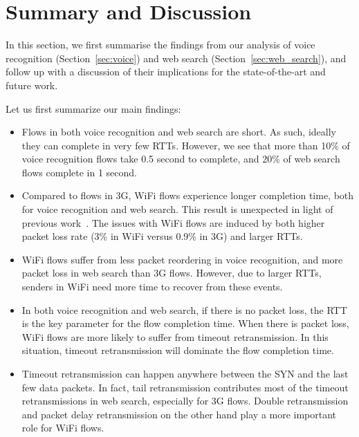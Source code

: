 
\section{Summary and Discussion}
\label{sec:discuss}

In this section, we first summarise the findings from our analysis of voice recognition (Section~\ref{sec:voice}) and web search (Section~\ref{sec:web_search}), and follow up with a discussion of their implications for the state-of-the-art and future work.

Let us first summarize our main findings:

\begin{itemize}
	\item Flows in both voice recognition and web search are short. As such, ideally they can complete in very few RTTs. 
	However, we see that more than 10\% of voice recognition flows take 0.5 second to complete, and 20\% of web search flows complete in 1 second.

	\item Compared to flows in 3G, WiFi flows experience longer completion time, both for voice recognition and web search. This result is unexpected in light of previous work~\cite{deshpande2010performance,sommers2012cell}. The issues with WiFi flows are induced by both higher packet loss rate (3\% in WiFi versus 0.9\% in 3G) and larger RTTs.

	\item WiFi flows suffer from less packet reordering in voice recognition, and more packet loss in web search than 3G flows. However, due to larger RTTs, senders in WiFi need more time to recover from these events.

	\item In both voice recognition and web search, if there is no packet loss, the RTT is the key parameter for the flow completion time. When there is packet loss, WiFi flows are more likely to suffer from timeout retransmission. In this situation, timeout retransmission will dominate the flow completion time.

	\item Timeout retransmission can happen anywhere between the SYN and the last few data packets. In fact, tail retransmission contributes most of the timeout retransmissions in web search, especially for 3G flows. Double retransmission and packet delay retransmission on the other hand play a more important role for WiFi flows.
	

\end{itemize}
